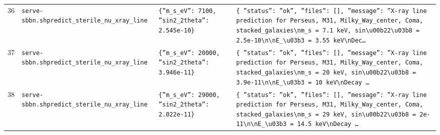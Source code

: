 \documentclass[11pt,a4paper]{article}
\begin{document}
\begin{longtable}{@{}p{}p{}p{}p{}@{}}
36 & \texttt{serve-sbbn.sh}\newline\texttt{predict\_\allowbreak{}sterile\_\allowbreak{}nu\_\allowbreak{}xray\_\allowbreak{}line} & \texttt{\{''m\_\allowbreak{}s\_\allowbreak{}eV'':\allowbreak{} 7100,\allowbreak{} ''sin2\_\allowbreak{}2theta'':\allowbreak{} 2.545e-10\}\allowbreak{}} & \texttt{\{   ''status'':\allowbreak{} ''ok'',\allowbreak{}   ''files'':\allowbreak{} []\allowbreak{},\allowbreak{}   ''message'':\allowbreak{} ''X-ray line prediction for Perseus,\allowbreak{} M31,\allowbreak{} Milky\_\allowbreak{}Way\_\allowbreak{}center,\allowbreak{} Coma,\allowbreak{} stacked\_\allowbreak{}galaxies\textbackslash{}\allowbreak{}nm\_\allowbreak{}s =\allowbreak{} 7.1 keV,\allowbreak{} sin\textbackslash{}\allowbreak{}u00b22\textbackslash{}\allowbreak{}u03b8 =\allowbreak{} 2.5e-10\textbackslash{}\allowbreak{}n\textbackslash{}\allowbreak{}nE\_\allowbreak{}\textbackslash{}\allowbreak{}u03b3 =\allowbreak{} 3.55 keV\textbackslash{}\allowbreak{}nDec\ldots{}\allowbreak{}} \\
37 & \texttt{serve-sbbn.sh}\newline\texttt{predict\_\allowbreak{}sterile\_\allowbreak{}nu\_\allowbreak{}xray\_\allowbreak{}line} & \texttt{\{''m\_\allowbreak{}s\_\allowbreak{}eV'':\allowbreak{} 20000,\allowbreak{} ''sin2\_\allowbreak{}2theta'':\allowbreak{} 3.946e-11\}\allowbreak{}} & \texttt{\{   ''status'':\allowbreak{} ''ok'',\allowbreak{}   ''files'':\allowbreak{} []\allowbreak{},\allowbreak{}   ''message'':\allowbreak{} ''X-ray line prediction for Perseus,\allowbreak{} M31,\allowbreak{} Milky\_\allowbreak{}Way\_\allowbreak{}center,\allowbreak{} Coma,\allowbreak{} stacked\_\allowbreak{}galaxies\textbackslash{}\allowbreak{}nm\_\allowbreak{}s =\allowbreak{} 20 keV,\allowbreak{} sin\textbackslash{}\allowbreak{}u00b22\textbackslash{}\allowbreak{}u03b8 =\allowbreak{} 3.9e-11\textbackslash{}\allowbreak{}n\textbackslash{}\allowbreak{}nE\_\allowbreak{}\textbackslash{}\allowbreak{}u03b3 =\allowbreak{} 10 keV\textbackslash{}\allowbreak{}nDecay \ldots{}\allowbreak{}} \\
38 & \texttt{serve-sbbn.sh}\newline\texttt{predict\_\allowbreak{}sterile\_\allowbreak{}nu\_\allowbreak{}xray\_\allowbreak{}line} & \texttt{\{''m\_\allowbreak{}s\_\allowbreak{}eV'':\allowbreak{} 29000,\allowbreak{} ''sin2\_\allowbreak{}2theta'':\allowbreak{} 2.022e-11\}\allowbreak{}} & \texttt{\{   ''status'':\allowbreak{} ''ok'',\allowbreak{}   ''files'':\allowbreak{} []\allowbreak{},\allowbreak{}   ''message'':\allowbreak{} ''X-ray line prediction for Perseus,\allowbreak{} M31,\allowbreak{} Milky\_\allowbreak{}Way\_\allowbreak{}center,\allowbreak{} Coma,\allowbreak{} stacked\_\allowbreak{}galaxies\textbackslash{}\allowbreak{}nm\_\allowbreak{}s =\allowbreak{} 29 keV,\allowbreak{} sin\textbackslash{}\allowbreak{}u00b22\textbackslash{}\allowbreak{}u03b8 =\allowbreak{} 2e-11\textbackslash{}\allowbreak{}n\textbackslash{}\allowbreak{}nE\_\allowbreak{}\textbackslash{}\allowbreak{}u03b3 =\allowbreak{} 14.5 keV\textbackslash{}\allowbreak{}nDecay \ldots{}\allowbreak{}} \\

\end{longtable}
\end{document}
